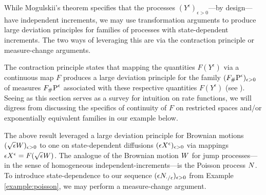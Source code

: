 While Mogulskii's theorem specifies that the processes $(Y^\epsilon)_{\epsilon>0}$---by design---have independent increments, we may use transformation arguments to produce large deviation principles for families of processes with state-dependent increments.
The two ways of leveraging this are via the contraction principle or measure-change arguments.

The contraction principle states that mapping the quantities $F(Y^\epsilon)$ via a continuous map $F$ produces a large deviation principle for the family $(\push{\Prb^\epsilon}{F})_{\epsilon>0}$ of measures $\push{\Prb^\epsilon}{F}$ associated with these respective quantities $F(Y^\epsilon)$ (see \cite[Theorem 4.2.1]{dembo2010}).
Seeing as this section serves as a survey for intuition on rate functions, we will digress from discussing the specifics of continuity of $F$ on restricted spaces and/or exponentially equivalent families in our example below.



The above result leveraged a large deviation principle for Brownian motions $(\sqrt\epsilon\W)_{\epsilon>0}$ to one on state-dependent diffusions $(\Xe)_{\epsilon>0}$ via mappings $\Xe = F(\sqrt\epsilon\W)$.
The analogue of the Brownian motion $\W$ for jump processes---in the sense of homogeneous independent-increments---is the Poisson process $\N$.
To introduce state-dependence to our sequence $(\epsilon\N_{\cdot/\epsilon})_{\epsilon>0}$ from Example \ref{example:poisson}, we may perform a measure-change argument.


